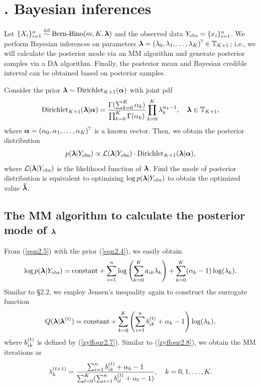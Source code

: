 
\section{$\!\!\!\!\!\!\!$. Bayesian inferences} %

Let $\{X_i\}_{i=1}^n \stackrel{{\rm iid}}{\sim} \mbox{Bern-Bino}(m, K, {\boldsymbol{\lambda}})$ and the observed data $Y_{\rm obs} = \{x_i\}_{i=1}^n$. We perform Bayesian inferences on parameters ${\boldsymbol{\lambda}} = (\lambda_0, \lambda_1, \dots, \lambda_K)^{\!\top\!} \in {\mathbb{T}}_{K+1}$; i.e., we will calculate the posterior mode via an MM algorithm and generate posterior samples via a DA algorithm. Finally, the posterior mean and Bayesian credible interval can be obtained based on posterior samples.

Consider the prior ${\boldsymbol{\lambda}} \sim \mbox{\rm Dirichlet}_{K+1}({\boldsymbol{\alpha}})$ with joint pdf
\begin{eqnarray}    \label{eqn2.4}
   \mbox{\rm Dirichlet}_{K+1}({\boldsymbol{\lambda}}| {\boldsymbol{\alpha}}) = \frac{\Gamma(\sum_{k=0}^K \alpha_k)} {\prod_{k=0}^K \Gamma(\alpha_k)} \prod_{k=0}^K \lambda_k^{\alpha_k-1}, \quad {\boldsymbol{\lambda}} \in {\mathbb{T}}_{K+1},
\end{eqnarray}
where ${\boldsymbol{\alpha}} = (\alpha_0,\alpha_1,\ldots,\alpha_K)^{\!\top\!}$ is a known vector. Then, we obtain the posterior distribution
\begin{eqnarray}    \label{eqn2.5}
   p({\boldsymbol{\lambda}}|Y_{\rm obs}) \propto {\cal L}({\boldsymbol{\lambda}}|Y_{\rm obs}) \cdot \mbox{\rm Dirichlet}_{K+1}({\boldsymbol{\lambda}}| {\boldsymbol{\alpha}}),
\end{eqnarray}
where ${\cal L}({\boldsymbol{\lambda}}|Y_{\rm obs})$ is the likelihood function of ${\boldsymbol{\lambda}}$. Find the mode of posterior distribution is equivalent to optimizing  $\log p({\boldsymbol{\lambda}}|Y_{\rm obs})$ to obtain the optimized value $\boldsymbol{\tilde{\lambda}}$.


\subsection{The MM algorithm to calculate the posterior mode of ${\boldsymbol{\lambda}}$}      %

From (\ref{eqn2.5}) with the prior (\ref{eqn2.4}), we easily obtain
\begin{eqnarray*}
   \log p({\boldsymbol{\lambda}}|Y_{\rm obs}) = \mbox{constant} + \sum_{i=1}^n \log \left(\sum_{k=0}^K a_{ik}\lambda_k \right) + \sum_{k=0}^K (\alpha_k-1)\log (\lambda_k).
\end{eqnarray*}
Similar to \S2.2, we employ Jensen's inequality again to construct the surrogate function
$$
   Q({\boldsymbol{\lambda}}|{\boldsymbol{\lambda}}^{(t)}) = \mbox{constant} + \sum_{k=0}^K \left(\sum_{i=1}^n b^{(t)}_{ik} + \alpha_k-1 \right) \log (\lambda_k),
$$
where $b^{(t)}_{ik}$ is defined by (\ref{zyffour2.7}). Similar to (\ref{zyffour2.8}), we obtain the MM iterations as
\begin{eqnarray*}
   \lambda^{(t+1)}_k = \frac{\sum_{i=1}^n b^{(t)}_{ik}+\alpha_k-1}{\sum_{l=0}^K (\sum_{i=1}^n b^{(t)}_{il}+\alpha_l-1)}, \quad k = 0, 1, \dots, K.
\end{eqnarray*}



